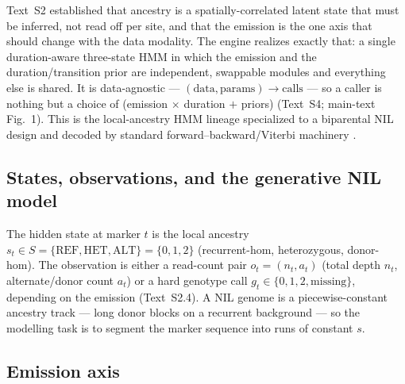 \documentclass[11pt]{article}
\newcommand{\REF}{\mathrm{REF}}
\newcommand{\HET}{\mathrm{HET}}
\newcommand{\ALT}{\mathrm{ALT}}
\begin{document}

Text~S2 established that ancestry is a spatially-correlated latent state that must
be inferred, not read off per site, and that the emission is the one axis that
should change with the data modality. The engine realizes exactly that: a single
duration-aware three-state HMM in which the emission and the duration/transition
prior are independent, swappable modules and everything else is shared. It is
data-agnostic --- $(\text{data},\text{params})\rightarrow\text{calls}$ --- so a
caller is nothing but a choice of (emission $\times$ duration $+$ priors)
(Text~S4; main-text Fig.~1). This is the local-ancestry HMM lineage
\citep{falush_2003,hapmix_2009,rfmix_2013,ancestryhmm_2017} specialized to a
biparental NIL design and decoded by standard forward--backward/Viterbi machinery
\citep{rabiner_1989}.

\subsection{States, observations, and the generative NIL model}
\label{sec:engine-model}

The hidden state at marker $t$ is the local ancestry
$s_t\in S=\{\REF,\HET,\ALT\}=\{0,1,2\}$ (recurrent-hom, heterozygous, donor-hom).
The observation is either a read-count pair $o_t=(n_t,a_t)$ (total depth $n_t$,
alternate/donor count $a_t$) or a hard genotype call $g_t\in\{0,1,2,\text{missing}\}$,
depending on the emission (Text~S2.4). A NIL genome is a piecewise-constant ancestry
track --- long donor blocks on a recurrent background --- so the modelling task is
to segment the marker sequence into runs of constant $s$.

\subsection{Emission axis}
\label{sec:engine-emission}
\end{document}
